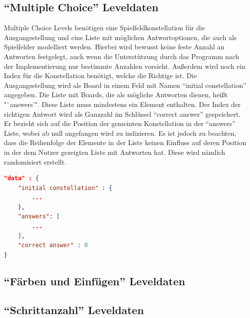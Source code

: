 \subsection{"`Multiple Choice"' Leveldaten}
Multiple Choice Levels benötigen eine Spielfeldkonstellation für die Ausgangsstellung und eine Liste mit möglichen Antwortoptionen, die auch als Spielfelder modelliert werden.
Hierbei wird bewusst keine feste Anzahl an Antworten festgelegt, auch wenn die Unterstützung durch das Programm nach der Implementierung nur bestimmte Anzahlen vorsieht.
Außerdem wird noch ein Index für die Konstellation benötigt, welche die Richtige ist.
Die Ausgangsstellung wird als Board in einem Feld mit Namen "`initial constellation"' angegeben.
Die Liste mit Boards, die als mögliche Antworten dienen, heißt "`answers'".
Diese Liste muss mindestens ein Element enthalten.
Der Index der richtigen Antwort wird als Ganzzahl im Schlüssel "`correct answer"' gespeichert.
Er bezieht sich auf die Position der gemeinten Konstellation in der "`answers"' Liste, wobei ab null angefangen wird zu indizieren.
Es ist jedoch zu beachten, dass die Reihenfolge der Elemente in der Liste keinen Einfluss auf deren Position in der dem Nutzer gezeigten Liste mit Antworten hat.
Diese wird nämlich randomisiert erstellt.

\begin{lstlisting}[language=json,caption={Grober Aufbau des data Attributs eines Multiple Choice Levels}]
"data" : {
	"initial constellation" : {
		...
	},
	"answers": [
		...
	],
	"correct answer" : 0
}
\end{lstlisting}

\subsection{"`Färben und Einfügen"' Leveldaten}

\subsection{"`Schrittanzahl"' Leveldaten}

